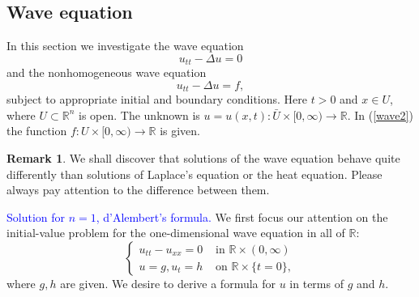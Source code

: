 \documentclass[hyperref,UTF8,12pt]{article}
\numberwithin{equation}{subsection}
\theoremstyle{plain}
\theoremstyle{definition}
\newtheorem{remark}{Remark}
\numberwithin{theorem}{section}
\numberwithin{lemma}{section}
\numberwithin{proposition}{section}
\numberwithin{remark}{section}
\numberwithin{corollary}{section}
\numberwithin{definition}{section}
\numberwithin{problem}{section}
\numberwithin{example}{section}
\newcommand{\mr}{\mathbb{R}}
\begin{document}
\subsection{Wave equation}
In this section we investigate the wave equation{\color{red}\[u_{tt}-\Delta u=0\tag{47}\label{wave1}\]}and the nonhomogeneous wave equation{\color{red}\[u_{tt}-\Delta u=f,\tag{48}\label{wave2}\]}subject to appropriate initial and boundary conditions. Here $t>0$ and $x\in U$, where $U\subset\mr^n$ is open. The unknown is $u=u(x,t):\bar{U}\times[0,\infty)\to\mr$. In (\ref{wave2}) the function $f: U\times[0,\infty)\to\mr$ is given.
\begin{remark}
We shall discover that solutions of the wave equation behave quite differently than solutions of Laplace's equation or the heat equation. Please always pay attention to the difference between them.
\end{remark}

\noindent\textcolor{blue}{Solution for $n=1$, d'Alembert's formula.} We first focus our attention on the initial-value problem for the one-dimensional wave equation in all of $\mr$:
\[\tag{49}\label{49}\left\{\begin{array}{cl}
	u_{tt}-u_{xx}=0 & \text{ in } \mr\times(0,\infty)\\
	u=g,u_t=h & \text{ on } \mr\times\{t=0\},
\end{array}\right.\]where $g,h$ are given. We desire to derive a formula for $u$ in terms of $g$ and $h$.
\end{document}
